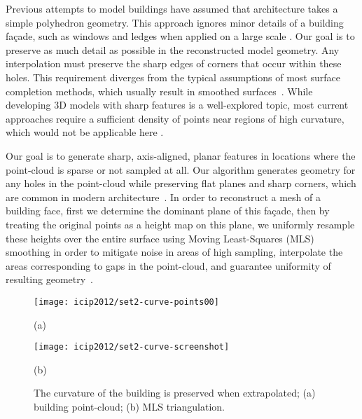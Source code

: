 \documentclass[12pt,onecolumn,oneside]{book}
\begin{document}
Previous attempts to model buildings have assumed that architecture takes a simple polyhedron geometry. This approach ignores minor details of a building fa\c{c}ade, such as windows and ledges when applied on a large scale \cite{Chauve10, Chen07}.  Our goal is to preserve as much detail as possible in the reconstructed model geometry.  Any interpolation must preserve the sharp edges of corners that occur within these holes.  This requirement diverges from the typical assumptions of most surface completion methods, which usually result in smoothed surfaces~\cite{Poisson, Kawai11}.  While developing 3D models with sharp features is a well-explored topic, most current approaches require a sufficient density of points near regions of high curvature, which would not be applicable here \cite{Bernardini04, Mhatre06}.  

Our goal is to generate sharp, axis-aligned, planar features in locations where the point-cloud is sparse or not sampled at all.  Our algorithm generates geometry for any holes in the point-cloud while preserving flat planes and sharp corners, which are common in modern architecture~\cite{Turner12outdoor}.  In order to reconstruct a mesh of a building face, first we determine the dominant plane of this fa\c{c}ade, then by treating the original points as a height map on this plane, we uniformly resample these heights over the entire surface using Moving Least-Squares (MLS) smoothing in order to mitigate noise in areas of high sampling, interpolate the areas corresponding to gaps in the point-cloud, and guarantee uniformity of resulting geometry~\cite{Nealen04}.

\begin{figure}[t]

\begin{minipage}[b]{0.5\linewidth}
  \centering
  \centerline{\texttt{[image: icip2012/set2-curve-points00]}}
  \centerline{(a)}\medskip
\end{minipage}
\hfill
\begin{minipage}[b]{0.5\linewidth}
  \centering
  \centerline{\texttt{[image: icip2012/set2-curve-screenshot]}}
  \centerline{(b)}\medskip
\end{minipage}
%
\caption[Surface reconstruction of building fa\c{c}ade.]{The curvature of the building is preserved when extrapolated; (a) building point-cloud; (b) MLS triangulation.}
\label{fig:extrapolate}
%
\end{figure}
\end{document}
